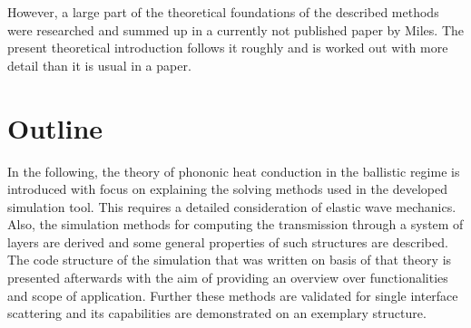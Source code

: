 However, a large part of the theoretical foundations of the described methods
were researched and summed up in a currently not published paper by Miles. The
present theoretical introduction follows it roughly and is worked out with more
detail than it is usual in a paper.

\section{Outline}
In the following, the theory of phononic heat conduction in the ballistic
regime is introduced with focus on explaining the solving methods used in the
developed simulation tool. This requires a detailed consideration of elastic
wave mechanics. Also, the simulation methods for computing the transmission
through a system of layers are derived and some general properties of such
structures are described.
The code structure of the simulation that was written on basis of
that theory is presented afterwards with the aim of providing an overview over
functionalities and scope of application. Further these methods are validated
for single interface scattering and its capabilities are demonstrated on an
exemplary structure.